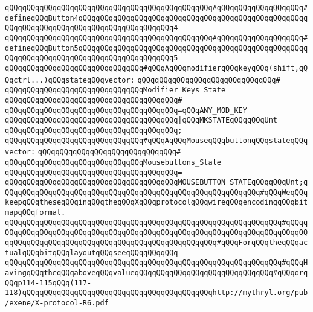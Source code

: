 \verb|qQQqqQQqqQQqqQQqqQQqqQQqqQQqqQQqqQQqqQQqqQQqqQQq#qQQqqQQqqQQqqQQqqQQq#defineqQQqButton4qQQqqQQqqQQqqQQqqQQqqQQqqQQqqQQqqQQqqQQqqQQqqQQqqQQqqQQqqQQqqQQqqQQqqQQqqQQqqQQqqQQqqQQqqQQq4|\newline
\verb|qQQqqQQqqQQqqQQqqQQqqQQqqQQqqQQqqQQqqQQqqQQqqQQq#qQQqqQQqqQQqqQQqqQQq#defineqQQqButton5qQQqqQQqqQQqqQQqqQQqqQQqqQQqqQQqqQQqqQQqqQQqqQQqqQQqqQQqqQQqqQQqqQQqqQQqqQQqqQQqqQQqqQQqqQQq5|\newline
\newline
\newline
\verb|qQQqqQQqqQQqqQQqqQQqqQQqqQQqqQQq#qQQqAqQQqmodifierqQQqkeyqQQq(shift,qQQqctrl...)qQQqstateqQQqvector:|\newline
\verb|qQQqqQQqqQQqqQQqqQQqqQQqqQQqqQQq#|\newline
\verb|qQQqqQQqqQQqqQQqqQQqqQQqqQQqqQQqModifier_Keys_State|\newline
\verb|qQQqqQQqqQQqqQQqqQQqqQQqqQQqqQQqqQQqqQQq#|\newline
\verb|qQQqqQQqqQQqqQQqqQQqqQQqqQQqqQQqqQQqqQQq=qQQqANY_MOD_KEY|\newline
\verb|qQQqqQQqqQQqqQQqqQQqqQQqqQQqqQQqqQQqqQQq|\verb#|qQQqMKSTATEqQQqqQQqUnt#\newline
\verb|qQQqqQQqqQQqqQQqqQQqqQQqqQQqqQQqqQQqqQQq;|\newline
\newline
\verb|qQQqqQQqqQQqqQQqqQQqqQQqqQQqqQQq#qQQqAqQQqMouseqQQqbuttonqQQqstateqQQqvector:|\newline
\verb|qQQqqQQqqQQqqQQqqQQqqQQqqQQqqQQq#|\newline
\verb|qQQqqQQqqQQqqQQqqQQqqQQqqQQqqQQqMousebuttons_State|\newline
\verb|qQQqqQQqqQQqqQQqqQQqqQQqqQQqqQQqqQQqqQQq=|\newline
\verb|qQQqqQQqqQQqqQQqqQQqqQQqqQQqqQQqqQQqqQQqMOUSEBUTTON_STATEqQQqqQQqUnt;qQQqqQQqqQQqqQQqqQQqqQQqqQQqqQQqqQQqqQQqqQQqqQQqqQQqqQQqqQQq#qQQqWeqQQqkeepqQQqtheseqQQqinqQQqtheqQQqXqQQqprotocolqQQqwireqQQqencodingqQQqbitmapqQQqformat.|\newline
\verb|qQQqqQQqqQQqqQQqqQQqqQQqqQQqqQQqqQQqqQQqqQQqqQQqqQQqqQQqqQQqqQQq#qQQqqQQqqQQqqQQqqQQqqQQqqQQqqQQqqQQqqQQqqQQqqQQqqQQqqQQqqQQqqQQqqQQqqQQqqQQqqQQqqQQqqQQqqQQqqQQqqQQqqQQqqQQqqQQqqQQqqQQqqQQq#qQQqForqQQqtheqQQqactualqQQqbitqQQqlayoutqQQqseeqQQqqQQqqQQq|\newline
\verb|qQQqqQQqqQQqqQQqqQQqqQQqqQQqqQQqqQQqqQQqqQQqqQQqqQQqqQQqqQQqqQQq#qQQqHavingqQQqtheqQQqaboveqQQqvalueqQQqqQQqqQQqqQQqqQQqqQQqqQQqqQQq#qQQqorqQQqp114-115qQQq(117-118)qQQqqQQqqQQqqQQqqQQqqQQqqQQqqQQqqQQqqQQqqQQqhttp://mythryl.org/pub/exene/X-protocol-R6.pdf|\newline
